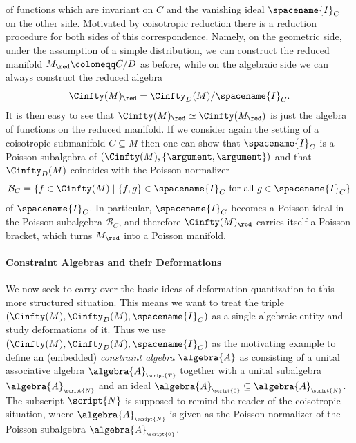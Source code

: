 \documentclass{memoir}
\newcommand{\Total}{{\scriptscriptstyle\script{T}}}
\newcommand{\Wobs}{{\scriptscriptstyle\script{N}}}
\newcommand{\Null}{{\scriptscriptstyle\script{0}}}
\newcommand{\WOBS}{\script{N}}
\newcommand{\vanishing}{\spacename{I}}
\newcommand{\Pnormalizer}{\mathcal{B}}
\begin{document}
of functions which are invariant on $C$ and the vanishing ideal $\vanishing_C$ on the other side.
Motivated by coisotropic reduction there is a reduction procedure for both sides of this correspondence.
Namely, on the geometric side, under the assumption of a simple distribution, 
we can construct the reduced manifold $M_\red \coloneqq C / D$ as before, 
while on the algebraic side we can always construct the reduced algebra
\begin{equation}
	\Cinfty(M)_\red = \Cinfty_D(M) / \vanishing_C.
\end{equation}
It is then easy to see that $\Cinfty(M)_\red \simeq \Cinfty(M_\red)$
is just the algebra of functions on the reduced manifold.
If we consider again the setting of a coisotropic submanifold $C \subseteq M$
then one can show that $\vanishing_C$ is a Poisson subalgebra of $(\Cinfty(M), \{\argument, \argument\})$
and that $\Cinfty_D(M)$ coincides with the Poisson normalizer
\begin{equation}
	\Pnormalizer_C = \{ f \in \Cinfty(M) \mid \{f,g\} \in \vanishing_C \text{ for all } g \in \vanishing_C\}	
\end{equation}
of $\vanishing_C$.
In particular, $\vanishing_C$ becomes a Poisson ideal in the Poisson subalgebra $\Pnormalizer_C$, and
therefore $\Cinfty(M)_\red$ carries itself a Poisson bracket, which turns
$M_\red$ into a Poisson manifold.

\paragraph{Constraint Algebras and their Deformations}
We now seek to carry over the basic ideas of deformation quantization to this more structured situation.
This means we want to treat the triple $(\Cinfty(M), \Cinfty_D(M),\vanishing_C)$
as a single algebraic entity and study deformations of it.
Thus we use $(\Cinfty(M), \Cinfty_D(M),\vanishing_C)$ as the motivating example to define an (embedded)
\emph{constraint algebra} $\algebra{A}$ as consisting of a unital associative algebra $\algebra{A}_\Total$
together with a unital subalgebra $\algebra{A}_\Wobs$ and an ideal $\algebra{A}_\Null \subseteq \algebra{A}_\Wobs$.
The subscript $\WOBS$ is supposed to remind the reader of the coisotropic situation, where $\algebra{A}_\Wobs$ is given as 
the Poisson normalizer of the Poisson subalgebra $\algebra{A}_\Null$.
\end{document}

